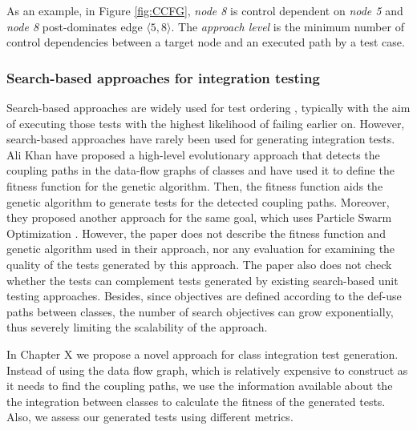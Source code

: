 %
As an example, in Figure \ref{fig:CCFG}, \textit{node 8} is control dependent on \textit{node 5} and \textit{node 8} post-dominates edge $\langle 5,8\rangle$. %
The \textit{approach level} is the minimum number of control dependencies between a target node and an executed path by a test case. 

\subsubsection{Search-based approaches for integration testing}

Search-based approaches are widely used for test ordering \cite{Wang2010, Steindl2012, Hashim2005, Vergilio2012, Bansal2009, JIiang2019, Borner2009, Mariani2016, Guizzo2015, Abdurazik2009, DaVeigaCabral2010, Briand2003a, Vergilio2012}, typically with the aim of executing those tests with the highest likelihood of failing earlier on. %
However, search-based approaches have rarely been used for generating integration tests. Ali Khan \etal \cite{AliKhan2013} have proposed a high-level evolutionary approach that detects the coupling paths in the data-flow graphs of classes and have used it to define the fitness function for the genetic algorithm. Then, the fitness function aids the genetic algorithm to generate tests for the detected coupling paths. Moreover, they proposed another approach for the same goal, which uses Particle Swarm Optimization \cite{Khan2014}. However, the paper does not describe the fitness function and genetic algorithm used in their approach, nor any evaluation for examining the quality of the tests generated by this approach. 
The paper also does not check whether the tests can complement tests generated by existing search-based unit testing approaches. Besides, since objectives are defined according to the def-use paths between classes, the number of search objectives can grow exponentially, thus severely limiting the scalability of the approach.

In Chapter X we propose a novel approach for class integration test generation.
Instead of using the data flow graph, which is relatively expensive to construct as it needs to find the coupling paths, we use the information available about the the integration between classes to calculate the fitness of the generated tests. Also, we assess our generated tests using different metrics.

